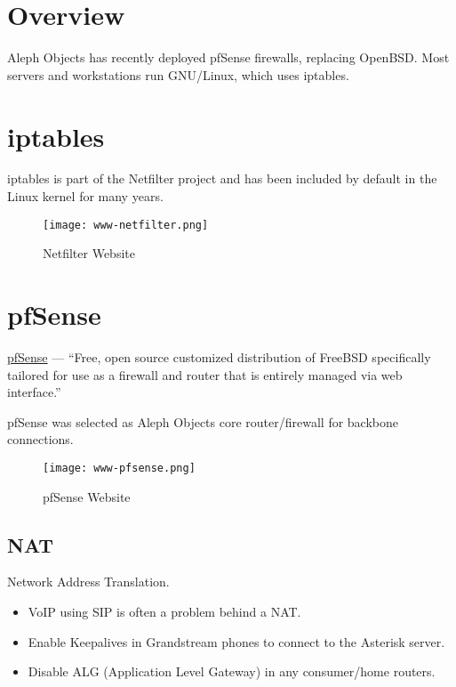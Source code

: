 %
%
%
%
%

\section{Overview}
Aleph Objects has recently deployed pfSense firewalls, replacing OpenBSD.
Most servers and workstations run GNU/Linux, which uses iptables.


\section{iptables}
iptables is part of the Netfilter project and has been included by default in
the Linux kernel for many years.

\begin{figure}[h!]
\texttt{[image: www-netfilter.png]}
 \caption{Netfilter Website}
 \label{fig:www-netfilter}
\end{figure}


\section{pfSense}
\href{https://www.pfsense.org/}{pfSense} --- ``Free, open source customized
distribution of FreeBSD specifically tailored for use as a firewall and router
that is entirely managed via web interface.''

pfSense was selected as Aleph Objects core router/firewall for backbone
connections.

\begin{figure}[h!]
\texttt{[image: www-pfsense.png]}
 \caption{pfSense Website}
 \label{fig:www-pfsense}
\end{figure}


\subsection{NAT}
Network Address Translation.

\begin{itemize}
 \item VoIP using SIP is often a problem behind a NAT.
 \item Enable Keepalives in Grandstream phones to connect to the Asterisk server.
 \item Disable ALG (Application Level Gateway) in any consumer/home routers.
\end{itemize}


